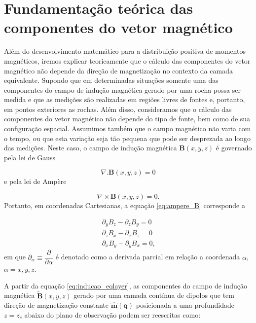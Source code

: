 \section{Fundamentação teórica das componentes do vetor magnético}
\label{sec:comp_vec_eqlayer}

Além do desenvolvimento matemático para a distribuição positiva de momentos magnéticos, iremos explicar teoricamente que o cálculo das componentes do vetor magnético não depende da direção de magnetização no contexto da camada equivalente. Supondo que em determinadas situações somente uma das componentes do campo de indução magnética gerado por uma rocha possa ser medida e que as medições são realizadas em regiões livres de fontes e, portanto, em pontos exteriores as rochas. Além disso, consideramos que o cálculo das componentes do vetor magnético não depende do tipo de fonte, bem como de sua configuração espacial. Assumimos também que o campo magnético não varia com o tempo, ou que esta variação seja tão pequena que pode ser desprezada ao longo das medições. Neste caso, o campo de indução magnética $\mathbf{B}(x,y,z)$ é governado pela lei de Gauss

\begin{equation}
\nabla . \mathbf{B} (x,y,z) = 0
\label{eq:gauss_B}
\end{equation}
e pela lei de Ampère 

\begin{equation}
\nabla \times \mathbf{B} (x,y,z) = 0.
\label{eq:ampere_B}
\end{equation}
Portanto, em coordenadas Cartesianas, a equação \ref{eq:ampere_B} corresponde a 

\begin{equation}
\begin{split}
\, \partial_y B_z - \partial_z B_y = 0 \:
\\
\, \partial_z B_x - \partial_x B_z = 0 \:
\\ 
\, \partial_x B_y - \partial_y B_x = 0 , 
\end{split}
\label{eq:ampere_B_condicao}
\end{equation}
em que $\partial_\alpha \equiv \dfrac{\partial}{\partial \alpha}$ é denotado como a derivada parcial em relação a coordenada $\alpha$, $\alpha=x,y,z$. 

A partir da equação \ref{eq:inducao_eqlayer}, as componentes do campo de indução magnética $\tilde{\mathbf{B}} (x,y,z)$ gerado por uma camada contínua de dipolos que tem direção de magnetização constante $\hat{\mathbf{m}} (\mathbf{q})$ posicionada a uma profundidade $z=z_c$ abaixo do plano de observação podem ser reescritas como:

